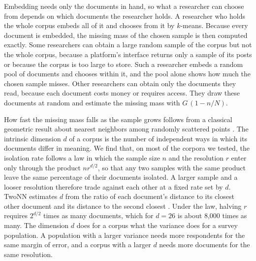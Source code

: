 Embedding needs only the documents in hand, so what a researcher can choose from depends on which documents the researcher holds. A researcher who holds the whole corpus embeds all of it and chooses from it by $k$-means. Because every document is embedded, the missing mass of the chosen sample is then computed exactly. Some researchers can obtain a large random sample of the corpus but not the whole corpus, because a platform's interface returns only a sample of its posts or because the corpus is too large to store. Such a researcher embeds a random pool of documents and chooses within it, and the pool alone shows how much the chosen sample misses. Other researchers can obtain only the documents they read, because each document costs money or requires access. They draw these documents at random and estimate the missing mass with $G\,(1 - n/N)$.

How fast the missing mass falls as the sample grows follows from a classical geometric result about nearest neighbors among randomly scattered points \citep{penrose2003rgg,levina2005}. The intrinsic dimension $d$ of a corpus is the number of independent ways in which its documents differ in meaning. We find that, on most of the corpora we tested, the isolation rate follows a law in which the sample size $n$ and the resolution $r$ enter only through the product $n r^{d/2}$, so that any two samples with the same product leave the same percentage of their documents isolated. A larger sample and a looser resolution therefore trade against each other at a fixed rate set by $d$. TwoNN estimates $d$ from the ratio of each document's distance to its closest other document and its distance to the second closest \citep{facco2017twonn}. Under the law, halving $r$ requires $2^{d/2}$ times as many documents, which for $d = 26$ is about 8{,}000 times as many. The dimension $d$ does for a corpus what the variance does for a survey population. A population with a larger variance needs more respondents for the same margin of error, and a corpus with a larger $d$ needs more documents for the same resolution.

